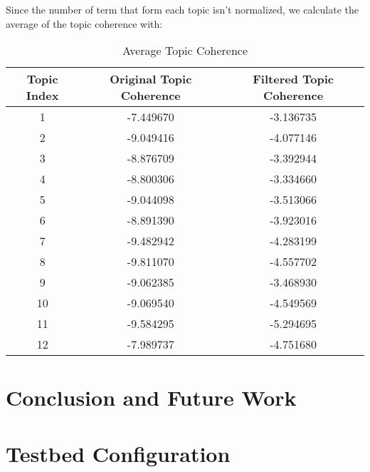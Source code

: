 \documentclass[11pt,twoside]{report}
\begin{document}
Since the number of term that form each topic isn't normalized, we calculate the average of the topic coherence with:
\begin{table}[ht]
\caption{Average Topic Coherence}
\centering
\begin{tabular}{c c c}
\hline\hline
Topic Index & Original Topic Coherence & Filtered Topic Coherence\\
\hline
1 & -7.449670 & -3.136735\\
2 & -9.049416 & -4.077146\\
3 & -8.876709 & -3.392944\\
4 & -8.800306 & -3.334660\\
5 & -9.044098 & -3.513066\\
6 & -8.891390 & -3.923016\\
7 & -9.482942 & -4.283199\\
8 & -9.811070 & -4.557702\\
9 & -9.062385 & -3.468930\\
10 & -9.069540 & -4.549569\\
11 & -9.584295 & -5.294695\\
12 & -7.989737 & -4.751680\\
\hline
\end{tabular}
\label{table:Average Topic Coherence}
\end{table}

\chapter{Conclusion and Future Work}

\appendix
\chapter{Testbed Configuration}



\end{document}
